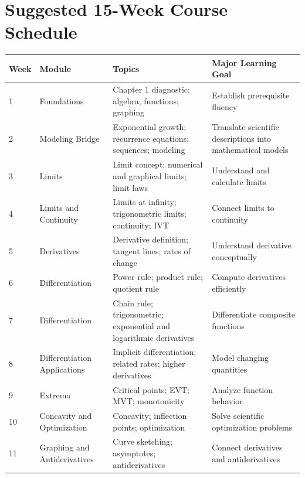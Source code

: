 \documentclass[11pt]{article}
\begin{document}
\section{Suggested 15-Week Course Schedule}

\begin{longtable}{p{0.7cm}p{3.2cm}p{5.5cm}p{4.2cm}}
\toprule
\textbf{Week} & \textbf{Module} & \textbf{Topics}
& \textbf{Major Learning Goal} \\
\midrule

1
& Foundations
& Chapter 1 diagnostic; algebra; functions; graphing
& Establish prerequisite fluency \\

2
& Modeling Bridge
& Exponential growth; recurrence equations; sequences; modeling
& Translate scientific descriptions into mathematical models \\

3
& Limits
& Limit concept; numerical and graphical limits; limit laws
& Understand and calculate limits \\

4
& Limits and Continuity
& Limits at infinity; trigonometric limits; continuity; IVT
& Connect limits to continuity \\

5
& Derivatives
& Derivative definition; tangent lines; rates of change
& Understand derivative conceptually \\

6
& Differentiation
& Power rule; product rule; quotient rule
& Compute derivatives efficiently \\

7
& Differentiation
& Chain rule; trigonometric; exponential and logarithmic derivatives
& Differentiate composite functions \\

8
& Differentiation Applications
& Implicit differentiation; related rates; higher derivatives
& Model changing quantities \\

9
& Extrema
& Critical points; EVT; MVT; monotonicity
& Analyze function behavior \\

10
& Concavity and Optimization
& Concavity; inflection points; optimization
& Solve scientific optimization problems \\

11
& Graphing and Antiderivatives
& Curve sketching; asymptotes; antiderivatives
& Connect derivatives and antiderivatives \\


\end{longtable}
\end{document}

